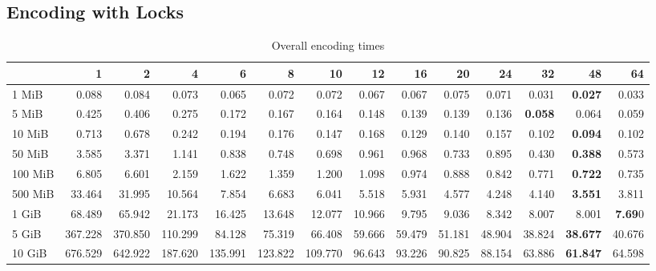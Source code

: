 \subsection{Encoding with Locks}
\begin{centering}
\begin{table}[!h]
	\caption{Overall encoding times}
	\begin{tabular}{lrrrrrrrrrrrrr}
		\toprule
		\diagbox[width=7em]{Size}{Threads} & 1  &      2  &      4  &      6  &      8  &      10 &     12 &     16 &     20 &     24 &     32 &     48 &     64 \\
		\midrule
		1 MiB   &   0.088 &   0.084 &   0.073 &   0.065 &   0.072 &   0.072 &  0.067 &  0.067 &  0.075 &  0.071 &  0.031 &  \textbf{0.027} &  0.033 \\
		5 MiB   &   0.425 &   0.406 &   0.275 &   0.172 &   0.167 &   0.164 &  0.148 &  0.139 &  0.139 &  0.136 &  \textbf{0.058} &  0.064 &  0.059 \\
		10 MiB  &   0.713 &   0.678 &   0.242 &   0.194 &   0.176 &   0.147 &  0.168 &  0.129 &  0.140 &  0.157 &  0.102 &  \textbf{0.094} &  0.102 \\
		50 MiB  &   3.585 &   3.371 &   1.141 &   0.838 &   0.748 &   0.698 &  0.961 &  0.968 &  0.733 &  0.895 &  0.430 &  \textbf{0.388} &  0.573 \\
		100 MiB &   6.805 &   6.601 &   2.159 &   1.622 &   1.359 &   1.200 &  1.098 &  0.974 &  0.888 &  0.842 &  0.771 &  \textbf{0.722} &  0.735 \\
		500 MiB &  33.464 &  31.995 &  10.564 &   7.854 &   6.683 &   6.041 &  5.518 &  5.931 &  4.577 &  4.248 &  4.140 &  \textbf{3.551} &  3.811 \\
		1 GiB   &  68.489 &  65.942 &  21.173 &  16.425 &  13.648 &  12.077 & 10.966 &  9.795 &  9.036 &  8.342 &  8.007 &  8.001 &  \textbf{7.69}0 \\
		5 GiB   & 367.228 & 370.850 & 110.299 &  84.128 &  75.319 &  66.408 & 59.666 & 59.479 & 51.181 & 48.904 & 38.824 & \textbf{38.677} & 40.676 \\
		10 GiB  & 676.529 & 642.922 & 187.620 & 135.991 & 123.822 & 109.770 & 96.643 & 93.226 & 90.825 & 88.154 & 63.886 & \textbf{61.847} & 64.598 \\
		\bottomrule
	\end{tabular}
	

\end{table}
\end{centering}
